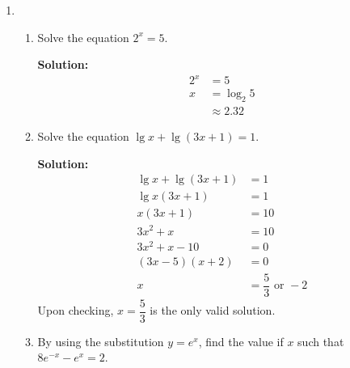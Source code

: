 \documentclass{report}
\newcommand{\sol}{\vspace{0.2cm}\textbf{Solution:}\vspace{0.2cm}}
\begin{document}
\begin{multicols*}{2}
\begin{enumerate}[leftmargin=*]
\begin{enumerate}
                  \item \begin{enumerate}
                            \item Solve the equation $2^x=5$.

                                  \sol{}
                                  \begin{align*}
                                      2^x & = 5          \\
                                      x   & = \log_2 5   \\
                                          & \approx 2.32
                                  \end{align*}

                                  \newpage
                            \item Solve the equation $\lg x+\lg (3 x+1)=1$.

                                  \sol{}
                                  \begin{align*}
                                      \lg x + \lg (3x + 1) & = 1                           \\
                                      \lg x(3x + 1)        & = 1                           \\
                                      x(3x + 1)            & = 10                          \\
                                      3x^2 + x             & = 10                          \\
                                      3x^2 + x - 10        & = 0                           \\
                                      (3x - 5)(x + 2)      & = 0                           \\
                                      x                    & = \dfrac{5}{3} \text{ or } -2
                                  \end{align*}
                                  Upon checking, $x = \dfrac{5}{3}$ is the only valid solution.

                            \item By using the substitution $y=e^x$, find the value if $x$ such that $8
                                      e^{-x}-e^x=2$.


\end{enumerate}
\end{enumerate}
\end{enumerate}
\end{multicols*}
\end{document}
